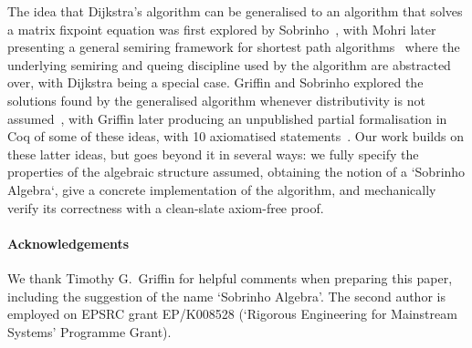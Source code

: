 The idea that Dijkstra's algorithm can be generalised to an algorithm that solves a matrix fixpoint equation was first explored by Sobrinho~\cite{sobrinho_algebra_2001}, with Mohri later presenting a general semiring framework for shortest path algorithms~\cite{mohri:semiring:2002} where the underlying semiring and queing discipline used by the algorithm are abstracted over, with Dijkstra being a special case.
Griffin and Sobrinho explored the solutions found by the generalised algorithm whenever distributivity is not assumed~\cite{sobrinho_routing_2010}, with Griffin later producing an unpublished partial formalisation in Coq of some of these ideas, with 10 axiomatised statements~\cite{griffin:equilibrium-coq}.
Our work builds on these latter ideas, but goes beyond it in several ways: we fully specify the properties of the algebraic structure assumed, obtaining the notion of a `Sobrinho Algebra`, give a concrete implementation of the algorithm, and mechanically verify its correctness with a clean-slate axiom-free proof.

\paragraph{Acknowledgements} We thank Timothy G.~Griffin for helpful comments when preparing this paper, including the suggestion of the name `Sobrinho Algebra'.
The second author is employed on EPSRC grant EP/K008528 (`Rigorous Engineering for Mainstream Systems' Programme Grant).
